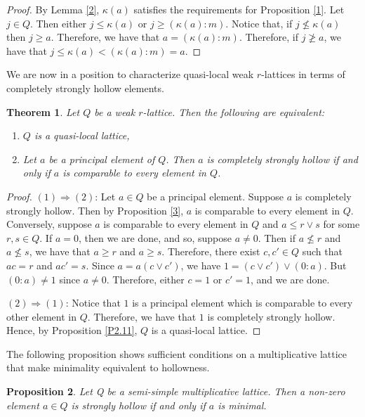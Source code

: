 \documentclass[11pt,english]{amsart}
\newtheorem{theorem}{Theorem}[section]
\newtheorem{proposition}[theorem]{Proposition}
\theoremstyle{definition}
\numberwithin{equation}{section}
\theoremstyle{remark}
\def\leq{\leqslant}
\begin{document}
	\begin{proof}
		By  Lemma \ref{2}, $\kappa(a)$ satisfies the requirements for Proposition \ref{1}. Let $j\in Q$. Then either $j\leq \kappa(a)$ or $j\geq (\kappa(a):m)$. Notice that, if $j\nleq \kappa(a)$ then $j\geq a$. Therefore, we have that $a=(\kappa(a):m)$. Therefore, if $j\ngeq a$, we have that $j\leq \kappa(a)<(\kappa(a):m)=a$.
	\end{proof}

	We are now in a position to characterize quasi-local weak $r$-lattices in terms of completely strongly hollow elements.
	
	\begin{theorem}\label{4}
		Let $Q$ be a weak $r$-lattice. Then the following are equivalent:
		\begin{enumerate}
			\item $Q$ is a quasi-local lattice, 
			\item Let $a$ be a principal element of $Q$. Then $a$ is completely strongly hollow if and only if $a$ is comparable to every element in $Q$.
		\end{enumerate}
	\end{theorem}
	
	\begin{proof}
		$(1)\Rightarrow (2)$: Let $a\in Q$ be a principal element. Suppose $a$ is completely strongly hollow. Then by Proposition \ref{3}, $a$ is comparable to every element in $Q$. Conversely, suppose $a$ is comparable to every element in $Q$ and $a\leq r\vee s$ for some $r,s\in Q$. If $a=0$, then we are done, and so, suppose $a\neq 0$. Then if $a\nleq r$ and $a\nleq s$, we have that $a\geqslant r$ and $a\geqslant s$. Therefore, there exist $c,c'\in Q$ such that $ac=r$ and $ac'=s$. Since $a=a(c\vee c')$, we have $1=(c\vee c')\vee (0:a)$. But $(0:a)\neq 1$ since $a\neq 0$. Therefore, either $c=1$ or $c'=1$, and we are done.  
		
		$(2)\Rightarrow (1)$: Notice that $1$ is a principal element which is comparable to every other element in $Q$. Therefore, we have that $1$ is completely strongly hollow. Hence, by Proposition \ref{P2.11}, $Q$ is a quasi-local lattice.
	\end{proof}
	
	
	The following proposition shows sufficient conditions on a multiplicative lattice that make minimality equivalent to hollowness. 
	\begin{proposition}\label{P3.1}
		Let Q be a semi-simple multiplicative lattice. Then a non-zero element $a\in Q$ is strongly hollow if and only if $a$ is minimal.
	\end{proposition}
	
\end{document}
